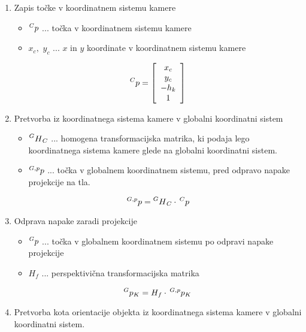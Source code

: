 \begin{enumerate}
\item Zapis točke v koordinatnem sistemu kamere
\begin{itemize}
    \item $\prescript{C}{}p$ ... točka v koordinatnem sistemu kamere
    \item $x_c,\,\, y_c$ ... $x$ in $y$ koordinate v koordinatnem sistemu kamere
\end{itemize}

\begin{equation}
\prescript{C}{}p =
\left[
\begin{array}{c}
x_c \\
y_c \\
-h_k \\
1
\end{array}
\right]
\end{equation}

\item Pretvorba iz koordinatnega sistema kamere v globalni koordinatni sistem
\begin{itemize}
    \item $\prescript{G}{}H_C$ ... homogena transformacijska matrika, ki podaja lego koordinatnega sistema kamere glede na globalni koordinatni sistem.
    \item $\prescript{G,p}{}p$ ... točka v globalnem koordinatnem sistemu, pred odpravo napake projekcije na tla.
\end{itemize}

\begin{equation}
    \prescript{G,p}{}p = \prescript{G}{}H_C \cdot \, \prescript{C}{}p
\end{equation}

\item Odprava napake zaradi projekcije
\begin{itemize}
    \item $\prescript{G}{}p$ ... točka v globalnem koordinatnem sistemu po odpravi napake projekcije
    \item $H_f$ ... perspektivična transformacijska matrika
\end{itemize}

\begin{equation}
    \prescript{G}{}p_K = H_f \cdot \, \prescript{G,p}{}p_K
\end{equation}

\item Pretvorba kota orientacije objekta iz koordinatnega sistema kamere v globalni koordinatni sistem.

\end{enumerate}

